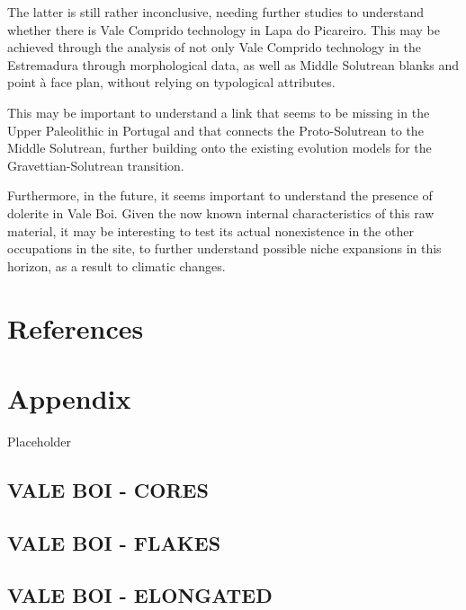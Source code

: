 \documentclass[12pt,twoside]{reedthesis}
\begin{document}
The latter is still rather inconclusive, needing further studies to understand whether there is Vale Comprido technology in Lapa do Picareiro. This may be achieved through the analysis of not only Vale Comprido technology in the Estremadura through morphological data, as well as Middle Solutrean blanks and point à face plan, without relying on typological attributes.

This may be important to understand a link that seems to be missing in the Upper Paleolithic in Portugal and that connects the Proto-Solutrean to the Middle Solutrean, further building onto the existing evolution models for the Gravettian-Solutrean transition.

Furthermore, in the future, it seems important to understand the presence of dolerite in Vale Boi. Given the now known internal characteristics of this raw material, it may be interesting to test its actual nonexistence in the other occupations in the site, to further understand possible niche expansions in this horizon, as a result to climatic changes.

\hypertarget{references}{%
\chapter*{References}\label{references}}


\noindent

\setlength{\parindent}{-0.20in}
\setlength{\leftskip}{0.20in}
\setlength{\parskip}{8pt}

\hypertarget{appendix}{%
\chapter{Appendix}\label{appendix}}

Placeholder

\hypertarget{vale-boi---cores}{%
\section{VALE BOI - CORES}\label{vale-boi---cores}}

\hypertarget{vale-boi---flakes}{%
\section{VALE BOI - FLAKES}\label{vale-boi---flakes}}

\hypertarget{vale-boi---elongated}{%
\section{VALE BOI - ELONGATED}\label{vale-boi---elongated}}
\end{document}
